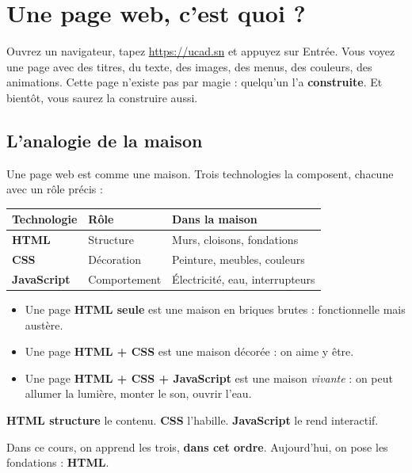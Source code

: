 \documentclass[11pt,a4paper]{article}
\begin{document}
\newpage

\section{Une page web, c'est quoi ?}

Ouvrez un navigateur, tapez \url{https://ucad.sn} et appuyez sur Entrée.
Vous voyez une page avec des titres, du texte, des images, des menus, des
couleurs, des animations. Cette page n'existe pas par magie : quelqu'un
l'a \textbf{construite}. Et bientôt, vous saurez la construire aussi.

\subsection{L'analogie de la maison}

Une page web est comme une maison. Trois technologies la composent, chacune
avec un rôle précis :

\begin{center}
\begin{tabular}{@{}lll@{}}
\toprule
\textbf{Technologie} & \textbf{Rôle} & \textbf{Dans la maison} \\
\midrule
\textbf{HTML} & Structure & Murs, cloisons, fondations \\
\textbf{CSS}  & Décoration & Peinture, meubles, couleurs \\
\textbf{JavaScript} & Comportement & Électricité, eau, interrupteurs \\
\bottomrule
\end{tabular}
\end{center}

\medskip

\begin{itemize}[leftmargin=*,nosep]
    \item Une page \textbf{HTML seule} est une maison en briques brutes : fonctionnelle mais austère.
    \item Une page \textbf{HTML + CSS} est une maison décorée : on aime y être.
    \item Une page \textbf{HTML + CSS + JavaScript} est une maison \textit{vivante} : on peut allumer la lumière, monter le son, ouvrir l'eau.
\end{itemize}

\begin{retenirbox}[À retenir]
\textbf{HTML structure} le contenu. \textbf{CSS} l'habille. \textbf{JavaScript} le rend interactif.

Dans ce cours, on apprend les trois, \textbf{dans cet ordre}. Aujourd'hui, on pose les fondations : \textbf{HTML}.
\end{retenirbox}
\end{document}
